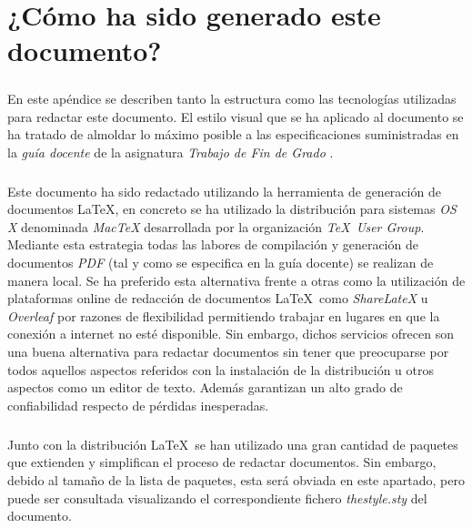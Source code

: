 \documentclass{subfiles}
\begin{document}
  \chapter{¿Cómo ha sido generado este documento?}

    \paragraph{}
    En este apéndice se describen tanto la estructura como las tecnologías utilizadas para redactar este documento. El estilo visual que se ha aplicado al documento se ha tratado de almoldar lo máximo posible a las especificaciones suministradas en la \emph{guía docente} de la asignatura \emph{Trabajo de Fin de Grado} \cite{uva:tfg-teaching-guide}.

    \paragraph{}
    Este documento ha sido redactado utilizando la herramienta de generación de documentos \LaTeX \cite{tool:latex}, en concreto se ha utilizado la distribución para sistemas \emph{OS X} denominada \emph{MacTeX} \cite{tool:mactex} desarrollada por la organización \emph{\TeX \ User Group}. Mediante esta estrategia todas las labores de compilación y generación de documentos \emph{PDF} (tal y como se especifica en la guía docente) se realizan de manera local. Se ha preferido esta alternativa frente a otras como la utilización de plataformas online de redacción de documentos \LaTeX \ como \emph{ShareLateX} \cite{tool:sharelatex} u \emph{Overleaf} \cite{tool:overleaf} por razones de flexibilidad permitiendo trabajar en lugares en que la conexión a internet no esté disponible. Sin embargo, dichos servicios ofrecen son una buena alternativa para redactar documentos sin tener que preocuparse por todos aquellos aspectos referidos con la instalación de la distribución u otros aspectos como un editor de texto. Además garantizan un alto grado de confiabilidad respecto de pérdidas inesperadas.

    \paragraph{}
    Junto con la distribución \LaTeX \ se han utilizado una gran cantidad de paquetes que extienden y simplifican el proceso de redactar documentos. Sin embargo, debido al tamaño de la lista de paquetes, esta será obviada en este apartado, pero puede ser consultada visualizando el correspondiente fichero \emph{thestyle.sty} del documento.
\end{document}
